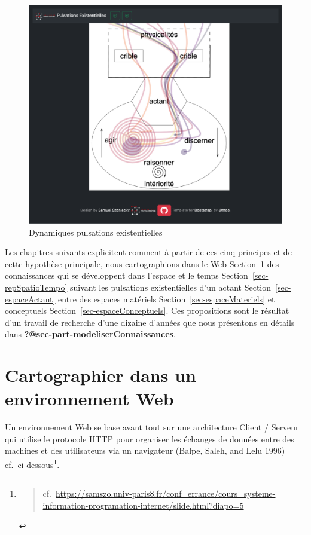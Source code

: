 \documentclass[
  letterpaper,
  DIV=11,
  numbers=noendperiod]{scrreprt}
\begin{document}
\begin{figure}

{\centering \includegraphics{images/localhost_samszo_HDR_pulsationsExistentielles.html.png}

}

\caption{\label{fig-dynamiquesPulsationsExistentielles}Dynamiques
pulsations existentielles}

\end{figure}

Les chapitres suivants explicitent comment à partir de ces cinq
principes et de cette hypothèse principale, nous cartographions dans le
Web Section~\ref{sec-cartoEnvWeb} des connaissances qui se développent
dans l'espace et le temps Section~\ref{sec-repSpatioTempo} suivant les
pulsations existentielles d'un actant Section~\ref{sec-espaceActant}
entre des espaces matériels Section~\ref{sec-espaceMateriels} et
conceptuels Section~\ref{sec-espaceConceptuels}. Ces propositions sont
le résultat d'un travail de recherche d'une dizaine d'années que nous
présentons en détails dans \textbf{?@sec-part-modeliserConnaissances}.

\hypertarget{sec-cartoEnvWeb}{%
\section{Cartographier dans un environnement
Web}\label{sec-cartoEnvWeb}}

Un environnement Web se base avant tout sur une architecture Client /
Serveur qui utilise le protocole HTTP pour organiser les échanges de
données entre des machines et des utilisateurs via un navigateur (Balpe,
Saleh, and Lelu 1996) cf.~ci-dessous\footnote{\begin{quote}
  cf.~\url{https://samszo.univ-paris8.fr/conf_errance/cours_systeme-information-programation-internet/slide.html?diapo=5}
  \end{quote}}.
\end{document}
